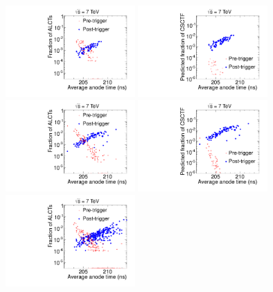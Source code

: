 \begin{figure}
  \begin{center}
      \includegraphics[clip=true, trim=0.0cm 0cm 3.0cm 0cm, width=0.44\textwidth]{figures/timing/ME11_Anode_vs_all3}
      \includegraphics[clip=true, trim=0.0cm 0cm 3.0cm 0cm, width=0.44\textwidth]{figures/timing/ME11_Anode_vs_TF_all} \\
      \includegraphics[clip=true, trim=0.0cm 0cm 3.0cm 0cm, width=0.44\textwidth]{figures/timing/Ring1_not11_Anode_vs_all3}
      \includegraphics[clip=true, trim=0.0cm 0cm 3.0cm 0cm, width=0.44\textwidth]{figures/timing/Ring1_not11_Anode_vs_TF_all} \\
      \includegraphics[clip=true, trim=0.0cm 0cm 3.0cm 0cm, width=0.44\textwidth]{figures/timing/Ring2_Anode_vs_all3}

\end{center}
\end{figure}
